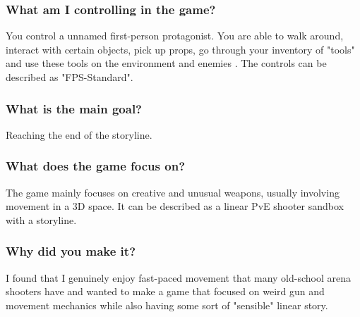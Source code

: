 \documentclass[10pt,a4paper]{article}
\begin{document}
\subsubsection{What am I controlling in the game?}
You control a unnamed first-person protagonist. You are able to walk around, interact with certain objects, pick up props, go through your inventory of "tools" and use these tools on the environment and enemies . The controls can be described as "FPS-Standard".
\subsubsection{What is the main goal?}
Reaching the end of the storyline.
\subsubsection{What does the game focus on?}
The game mainly focuses on creative and unusual weapons, usually involving movement in a 3D space. It can be described as a linear PvE shooter sandbox with a storyline.
\subsubsection{Why did you make it?}
I found that I genuinely enjoy fast-paced movement that many old-school arena shooters have and wanted to make a game that focused on weird gun and movement mechanics while also having some sort of "sensible" linear story.
\end{document}
